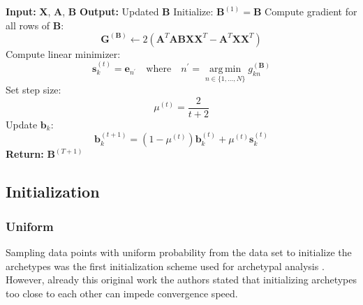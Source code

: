 \documentclass{article}
\begin{document}
\begin{algorithm}[H]
    \caption{Update B via Frank-Wolfe}
    \label{alg:frank_wolfe_update_B}
    \begin{algorithmic}[1]
    \State \textbf{Input:} $\mathbf{X}$, $\mathbf{A}$, $\mathbf{B}$
    \State \textbf{Output:} Updated $\mathbf{B}$
    \State Initialize: $\mathbf{B}^{(1)} = \mathbf{B}$
        \State Compute gradient for all rows of $\mathbf{B}$:
        \begin{equation}
        \mathbf{G}^{(\mathbf{B})} \gets 2 \left( \mathbf{A}^T \mathbf{A} \mathbf{B} \mathbf{X} \mathbf{X}^T - \mathbf{A}^T \mathbf{X} \mathbf{X}^T \right)
        \end{equation}
            \State Compute linear minimizer:
            \begin{equation}
            \mathbf{s}_k^{(t)} = \mathbf{e}_{n^\prime} \quad \text{where} \quad n^\prime = \operatorname*{arg\,min}_{ n \in \{1, ..., N\} } g_{kn}^{(\mathbf{B})}
            \end{equation}
            \State Set step size:
            \begin{equation}
            \mu^{(t)} = \frac{2}{t+2}
            \end{equation}
            \State Update $\mathbf{b}_k$:
            \begin{equation}
            \mathbf{b}_k^{(t+1)} = (1-\mu^{(t)}) \mathbf{b}_k^{(t)} + \mu^{(t)} \mathbf{s}_k^{(t)}
            \end{equation}
        \EndFor
    \EndFor
    \State \textbf{Return:} $\mathbf{B}^{(T+1)}$
    \end{algorithmic}
\end{algorithm}

\subsection{Initialization}

\subsubsection{Uniform}

Sampling data points with uniform probability from the data set to initialize the archetypes was the first initialization scheme used for archetypal analysis \autocite{cutlerArchetypalAnalysis1994}. However, already this original work the authors stated that initializing archetypes too close to each other can impede convergence speed.
\end{document}
